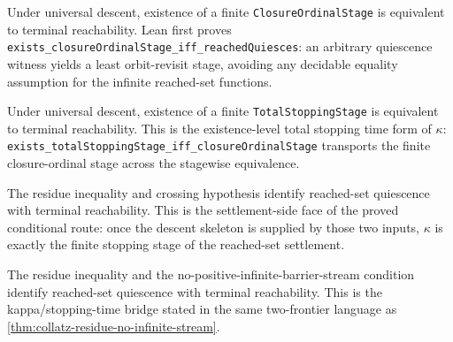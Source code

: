 \begin{theorem}
  \label{thm:collatz-kappa-stage-exists}
  \leanok
  Under universal descent, existence of a finite \texttt{ClosureOrdinalStage} is
  equivalent to terminal reachability. Lean first proves
  \texttt{exists\_closureOrdinalStage\_iff\_reachedQuiesces}: an arbitrary
  quiescence witness yields a least orbit-revisit stage, avoiding any decidable
  equality assumption for the infinite reached-set functions.
\end{theorem}

\begin{theorem}
  \label{thm:collatz-total-stopping-stage-exists}
  \leanok
  Under universal descent, existence of a finite \texttt{TotalStoppingStage} is
  equivalent to terminal reachability. This is the existence-level total stopping
  time form of \(\kappa\): \texttt{exists\_totalStoppingStage\_iff\_closureOrdinalStage}
  transports the finite closure-ordinal stage across the stagewise equivalence.
\end{theorem}

\begin{theorem}
  \label{thm:collatz-residue-kappa-stopping-time}
  \leanok
  The residue inequality and crossing hypothesis identify reached-set quiescence with terminal
  reachability. This is the settlement-side face of the proved conditional route: once the
  descent skeleton is supplied by those two inputs, $\kappa$ is exactly the finite stopping
  stage of the reached-set settlement.
\end{theorem}

\begin{theorem}
  \label{thm:collatz-residue-no-infinite-stream-kappa}
  \leanok
  The residue inequality and the no-positive-infinite-barrier-stream condition identify
  reached-set quiescence with terminal reachability. This is the kappa/stopping-time bridge
  stated in the same two-frontier language as \cref{thm:collatz-residue-no-infinite-stream}.
\end{theorem}

